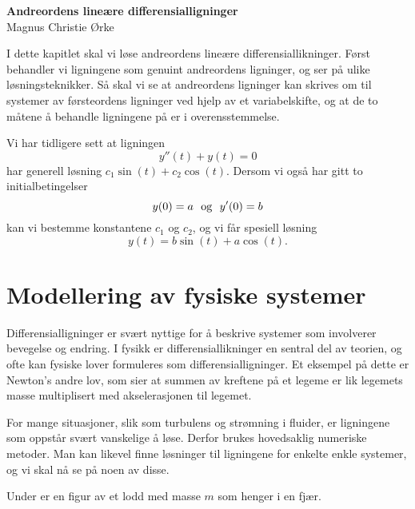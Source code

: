 \documentclass{article}
\theoremstyle{definition}
\newenvironment{ex}
{\pushQED{\qed}\renewcommand{\qedsymbol}{$\triangle$}\exx}
{\popQED\endexx}
\theoremstyle{remark}
\newcommand{\springfig}[6]{%
\begin{scope}[xshift=#6,
              spring/.style = {decorate,
                              decoration = {aspect         = 0.5, 
                                            segment length = #1,
                                            amplitude      = 2mm,
                                            coil}}]

\path (0,0)                            coordinate (g) 
      (0,-0.5cm)                       coordinate (topspring) 
      (0, #2)                          coordinate (bottomspring) 
      (bottomspring) ++(0,-.3cm)       coordinate (pt2)
                      +(0cm,-#3)       coordinate (pt3)
                      +(1.25cm,-#3)    coordinate (#5 pt3);

  \node [platform,
        anchor = south] at (g)  {};
  \draw [very thick]    (-0.5,0)         -- (0.5,0);
  \draw                (topspring)     -- (g)
                      (bottomspring)  -- (pt2.north);
  \draw [spring]       (bottomspring)  -- (topspring);
  \draw [fill=black] (pt3) circle (#3) 
                          node[inner sep = 0,
                                scale     = #4,
                                text      = white]{$m$};
  \node[below=1.5*#3] at (pt3) {#5};
  \end{scope}
}
\begin{document}
\begin{center}
    \large{\textbf{Andreordens lineære differensialligninger}}
    \\
    \normalsize{Magnus Christie Ørke}
\end{center}
\vspace{\baselineskip}

\begin{multicols*}{2}
I dette kapitlet skal vi løse andreordens lineære differensiallikninger. Først behandler vi ligningene som genuint andreordens ligninger, og ser på ulike løsningsteknikker. Så skal vi se at andreordens ligninger kan skrives om til systemer av førsteordens ligninger ved hjelp av et variabelskifte, og at de to måtene å behandle ligningene på er i overensstemmelse.

\begin{ex}
Vi har tidligere sett at ligningen
\begin{equation*}
    y''(t) + y(t) = 0
\end{equation*}
har generell løsning $c_1 \sin(t) + c_2 \cos(t)$. Dersom vi også har gitt to initialbetingelser
\begin{equation*}
  y(0) = a \ \textnormal{ og } \ y'(0) = b
\end{equation*} kan vi bestemme konstantene $c_1$ og $c_2$, og vi får spesiell løsning
\begin{equation*}
  y(t) = b \sin(t) + a \cos(t).
\end{equation*}
\end{ex}


\section*{Modellering av fysiske systemer}
Differensialligninger er svært nyttige for å beskrive systemer som involverer bevegelse og endring. I fysikk er differensiallikninger en sentral del av teorien, og ofte kan fysiske lover formuleres som differensialligninger. Et eksempel på dette er Newton's andre lov, som sier at summen av kreftene på et legeme er lik legemets masse multiplisert med akselerasjonen til legemet.

For mange situasjoner, slik som turbulens og strømning i fluider, er ligningene som oppstår svært vanskelige å løse. Derfor brukes hovedsaklig numeriske metoder. Man kan likevel finne løsninger til ligningene for enkelte enkle systemer, og vi skal nå se på noen av disse.

\begin{ex} \label{ex:fjær}
  Under er en figur av et lodd med masse $m$ som henger i en fjær.
  \begin{center}
\end{center}
\end{ex}
\end{multicols*}
\end{document}
